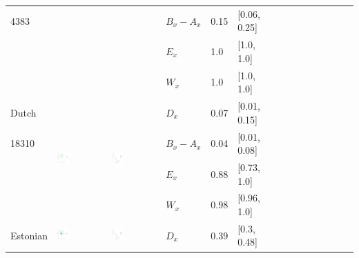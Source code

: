 \documentclass[11pt,letterpaper]{article}
\begin{document}
\begin{longtable}{lllllllllllllll}
4383  &    &    &  $B_x-A_x$  &  0.15  &  [0.06, 0.25]  \\ 
  &    &    &  $E_x$  &  1.0  &  [1.0, 1.0]  \\ 
  &    &    &  $W_x$  &  1.0  &  [1.0, 1.0]  \\ [10.25ex] \hline
Dutch  &  \multirow{4}{*}{\includegraphics[width=0.25\textwidth]{figures/Dutch-entropy-memory.pdf}}  &  \multirow{4}{*}{\includegraphics[width=0.25\textwidth]{figures/Dutch-listener-surprisal-memory.pdf}}  &  $D_x$  &  0.07  &  [0.01, 0.15]  \\ 
18310  &    &    &  $B_x-A_x$  &  0.04  &  [0.01, 0.08]  \\ 
  &    &    &  $E_x$  &  0.88  &  [0.73, 1.0]  \\ 
  &    &    &  $W_x$  &  0.98  &  [0.96, 1.0]  \\ [10.25ex] \hline
Estonian  &  \multirow{4}{*}{\includegraphics[width=0.25\textwidth]{figures/Estonian-entropy-memory.pdf}}  &  \multirow{4}{*}{\includegraphics[width=0.25\textwidth]{figures/Estonian-listener-surprisal-memory.pdf}}  &  $D_x$  &  0.39  &  [0.3, 0.48]  \\ 

\end{longtable}
\end{document}
